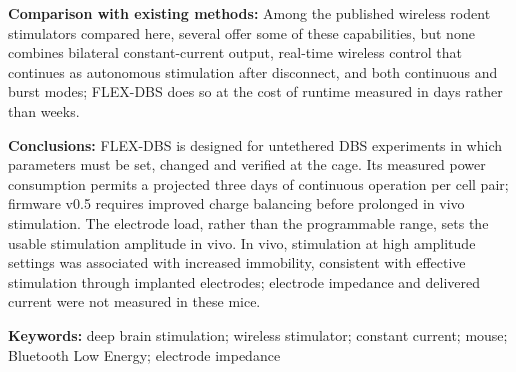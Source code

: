 \textbf{Comparison with existing methods:} Among the published wireless rodent stimulators compared here, several offer some of these capabilities, but none combines bilateral constant-current output, real-time wireless control that continues as autonomous stimulation after disconnect, and both continuous and burst modes; FLEX-DBS does so at the cost of runtime measured in days rather than weeks.

\textbf{Conclusions:} FLEX-DBS is designed for untethered DBS experiments in which parameters must be set, changed and verified at the cage. Its measured power consumption permits a projected three days of continuous operation per cell pair; firmware v0.5 requires improved charge balancing before prolonged in vivo stimulation. The electrode load, rather than the programmable range, sets the usable stimulation amplitude in vivo. In vivo, stimulation at high amplitude settings was associated with increased immobility, consistent with effective stimulation through implanted electrodes; electrode impedance and delivered current were not measured in these mice.

\textbf{Keywords:} deep brain stimulation; wireless stimulator; constant current; mouse; Bluetooth Low Energy; electrode impedance
